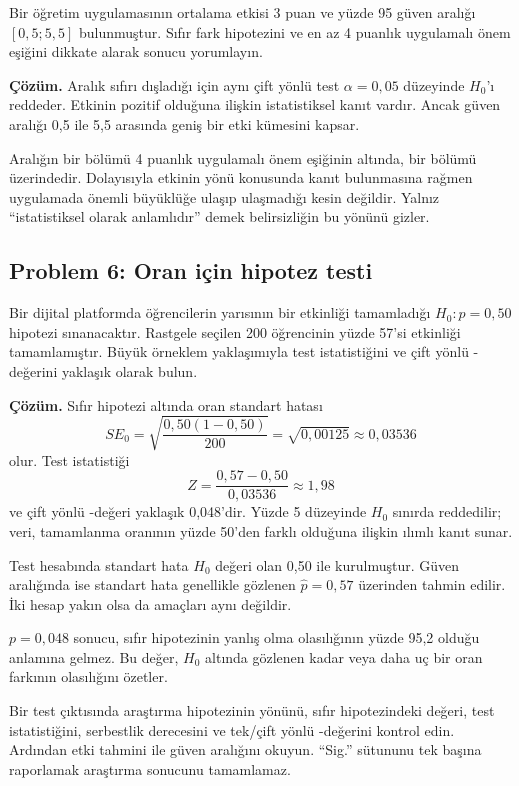 Bir öğretim uygulamasının ortalama etkisi 3 puan ve yüzde 95 güven aralığı
$[0{,}5;5{,}5]$ bulunmuştur. Sıfır fark hipotezini ve en az 4 puanlık
uygulamalı önem eşiğini dikkate alarak sonucu yorumlayın.

\textbf{Çözüm.} Aralık sıfırı dışladığı için aynı çift yönlü test
$\alpha=0{,}05$ düzeyinde $H_0$'ı reddeder. Etkinin pozitif olduğuna ilişkin
istatistiksel kanıt vardır. Ancak güven aralığı 0,5 ile 5,5 arasında geniş bir
etki kümesini kapsar.

Aralığın bir bölümü 4 puanlık uygulamalı önem eşiğinin altında, bir bölümü
üzerindedir. Dolayısıyla etkinin yönü konusunda kanıt bulunmasına rağmen
uygulamada önemli büyüklüğe ulaşıp ulaşmadığı kesin değildir. Yalnız
``istatistiksel olarak anlamlıdır'' demek belirsizliğin bu yönünü gizler.

\subsection*{Problem 6: Oran için hipotez testi}

Bir dijital platformda öğrencilerin yarısının bir etkinliği tamamladığı
$H_0:p=0{,}50$ hipotezi sınanacaktır. Rastgele seçilen 200 öğrencinin yüzde
57'si etkinliği tamamlamıştır. Büyük örneklem yaklaşımıyla test istatistiğini
ve çift yönlü \pval-değerini yaklaşık olarak bulun.

\textbf{Çözüm.} Sıfır hipotezi altında oran standart hatası
\[
SE_0=\sqrt{\frac{0{,}50(1-0{,}50)}{200}}
=\sqrt{0{,}00125}\approx0{,}03536
\]
olur. Test istatistiği
\[
Z=\frac{0{,}57-0{,}50}{0{,}03536}\approx1{,}98
\]
ve çift yönlü \pval-değeri yaklaşık 0,048'dir. Yüzde 5 düzeyinde $H_0$ sınırda
reddedilir; veri, tamamlanma oranının yüzde 50'den farklı olduğuna ilişkin
ılımlı kanıt sunar.

Test hesabında standart hata $H_0$ değeri olan 0,50 ile kurulmuştur. Güven
aralığında ise standart hata genellikle gözlenen $\hat p=0{,}57$ üzerinden
tahmin edilir. İki hesap yakın olsa da amaçları aynı değildir.

\begin{mistakebox}
$p=0{,}048$ sonucu, sıfır hipotezinin yanlış olma olasılığının yüzde 95,2
olduğu anlamına gelmez. Bu değer, $H_0$ altında gözlenen kadar veya daha uç
bir oran farkının olasılığını özetler.
\end{mistakebox}

\begin{outputguidebox}
Bir test çıktısında araştırma hipotezinin yönünü, sıfır hipotezindeki değeri,
test istatistiğini, serbestlik derecesini ve tek/çift yönlü \pval-değerini kontrol
edin. Ardından etki tahmini ile güven aralığını okuyun. ``Sig.'' sütununu tek
başına raporlamak araştırma sonucunu tamamlamaz.
\end{outputguidebox}

